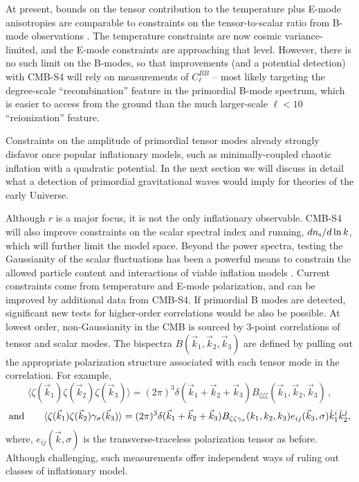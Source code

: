 At present, bounds on the tensor contribution to the temperature plus E-mode anisotropies are comparable to constraints on the tensor-to-scalar ratio from B-mode observations \cite{Ade:2013uln,Ade:2015lrj}. The temperature constraints are now cosmic variance-limited, and the E-mode constraints are approaching that level.  However, there is no such
limit on the B-modes, so that improvements (and a potential detection) with CMB-S4 will rely on measurements of $C_\ell^{BB}$ -- most likely targeting the degree-scale ``recombination'' feature in the primordial B-mode spectrum, which is easier to access from the ground than the much larger-scale $\ell < 10$ ``reionization'' feature.

Constraints on the amplitude of primordial tensor modes already strongly disfavor once popular inflationary models, such as minimally-coupled chaotic inflation with a quadratic potential. In the next section we will discuss in detail what a detection of primordial gravitational waves would imply for theories of the early Universe. 

Although $r$ is a major focus, it is not the only inflationary observable.
CMB-S4 will also improve constraints on the scalar spectral index and
running, $dn_{\rm s}/d\ln k$, which will further limit the model space.
Beyond the power spectra,
testing the Gaussianity of the scalar fluctuations has been a powerful means to constrain the allowed particle content and interactions of viable inflation models \cite{Ade:2013ydc,Ade:2015ava}. Current constraints come from temperature and E-mode polarization, and can be improved by additional data from CMB-S4. If primordial B modes are detected, significant new tests for higher-order correlations would be also be possible. At lowest order, non-Gaussianity in the CMB is sourced by 3-point correlations of tensor and scalar modes. The bispectra $B(\vec{k}_1,\vec{k}_2,\vec{k}_3)$ are defined by pulling out the appropriate polarization structure associated with each tensor mode in the correlation. For example,
\begin{equation}
\label{eq:Bsss}
\langle\zeta(\vec{k}_1)\zeta(\vec{k}_2)\zeta(\vec{k}_3)\rangle=(2\pi)^3\delta(\vec{k}_1+\vec{k}_2+\vec{k}_3)B_{\zeta\zeta\zeta}(\vec{k}_1,\vec{k}_2,\vec{k}_3)\,,
\end{equation}
\begin{equation}
\label{eq:Bsst}
{\rm and}\qquad \langle \zeta(\vec{k}_1)\zeta(\vec{k}_2)\gamma_\sigma(\vec{k}_3) \rangle = (2\pi)^3 \delta(\vec{k}_1+\vec{k}_2+\vec{k}_3) B_{\zeta\zeta\gamma_\sigma}(k_1,k_2,k_3) e_{ij}(\vec{k}_3,\sigma)\hat{k}_1^i \hat{k}_2^j, 
\end{equation}
where, $e_{ij}(\vec{k},\sigma)$ is the transverse-traceless polarization tensor as before.  Although challenging, such measurements offer independent ways of ruling out classes of inflationary model.

